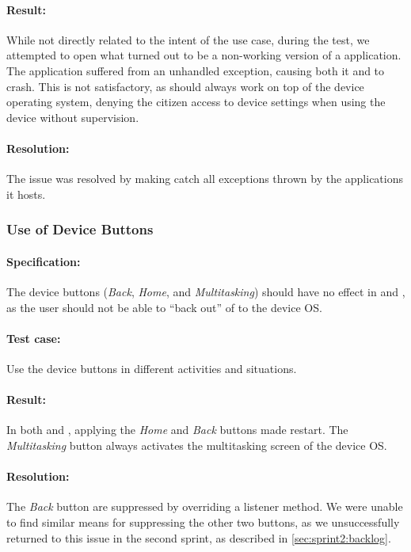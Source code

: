 \paragraph{Result:} While not directly related to the intent of the use case, during the test, we attempted to open what turned out to be a non-working version of a \giraf application. 
The application suffered from an unhandled exception, causing both it and \launcher to crash. 
This is not satisfactory, as \launcher should always work on top of the device operating system, denying the citizen access to device settings when using the device without supervision.
\paragraph{Resolution:} The issue was resolved by making \launcher catch all exceptions thrown by the \giraf applications it hosts.

\subsubsection{Use of Device Buttons}

\paragraph{Specification:} The device buttons (\textit{Back}, \textit{Home}, and \textit{Multitasking}) should have no effect in \mainactivity and \authenticationactivity, as the user should not be able to ``back out'' of \launcher to the device OS.
\paragraph{Test case:} Use the device buttons in different activities and situations.
\paragraph{Result:} In both \mainactivity and \authenticationactivity, applying the \textit{Home} and \textit{Back} buttons made \launcher restart. 
The \textit{Multitasking} button always activates the multitasking screen of the device OS.
\paragraph{Resolution:} The \textit{Back} button are suppressed by overriding a listener method.
We were unable to find similar means for suppressing the other two buttons, as we unsuccessfully returned to this issue in the second sprint, as described in \cref{sec:sprint2:backlog}.